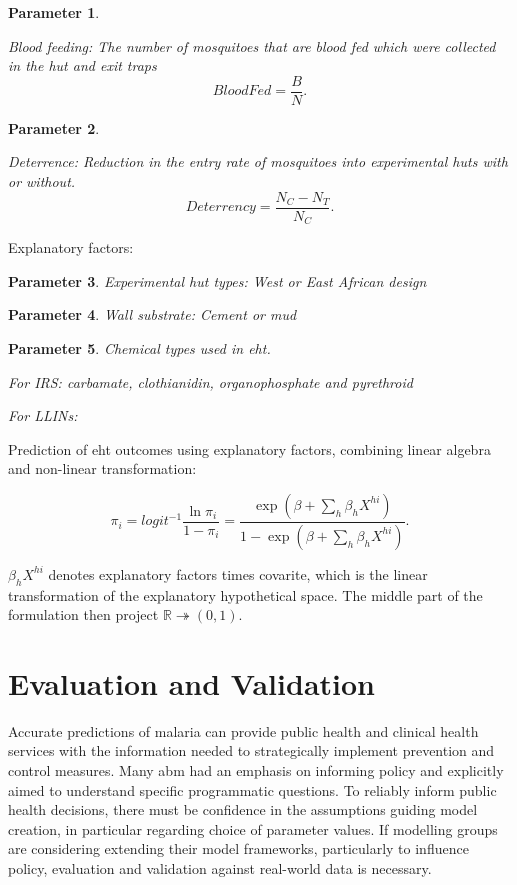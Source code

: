 \documentclass[a4paper, 12pt, twoside]{article}
\newtheorem{parameter}{Parameter}
\begin{document}
\begin{parameter}
	\label{eht:blood_fed}

	Blood feeding: The number of mosquitoes that are blood fed which were collected in the hut and exit traps
	\[
		BloodFed = \frac{B}{N}
		.\]
\end{parameter}

\begin{parameter}
	\label{eht:Deterrence}

	Deterrence: Reduction in the entry rate of mosquitoes into experimental huts with or without.
	\[
		Deterrency = \frac{N_C - N_T}{N_C}
		.\]
\end{parameter}

Explanatory factors:

\begin{parameter}
	\label{eht:experimental_hut_types}
	Experimental hut types: West or East African design

\end{parameter}

\begin{parameter}
	\label{eht:wall_substrate} Wall substrate: Cement or mud

\end{parameter}

\begin{parameter}
	\label{eht:chemical_class_used}
	Chemical types used in \gls{eht}.

	For IRS: carbamate, clothianidin, organophosphate and pyrethroid

	For LLINs:

\end{parameter}

Prediction of \gls{eht} outcomes using explanatory factors, combining linear algebra and non-linear transformation\cite{Sherrard-Smith2018b}:

\[
	\pi_i = logit^{-1} \frac{\ln \pi_i}{1-\pi_i} = \frac{ \exp( \beta + \sum_h \beta_h X^{hi} ) }{ 1 - \exp( \beta + \sum_h \beta_h X^{hi} ) }
	.\]

$\beta_h X^{hi}$ denotes explanatory factors times covarite, which is the linear transformation of the explanatory hypothetical space. The middle part of the formulation then project $\mathbb{R} \twoheadrightarrow (0,1)$.

\section{Evaluation and Validation}
Accurate predictions of malaria can provide public health and clinical health services with the information needed to strategically implement prevention and control measures.
Many \gls{abm} had an emphasis on informing policy and explicitly aimed to understand specific programmatic questions.
To reliably inform public health decisions, there must be confidence in the assumptions guiding model creation, in particular regarding choice of parameter values.
If modelling groups are considering extending their model frameworks, particularly to influence policy, evaluation and validation against real-world data is necessary.
\end{document}
